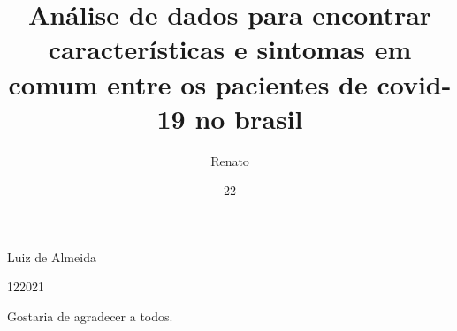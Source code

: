 \documentclass[tcc1]{uftex}
\begin{document}
  \title{Análise de dados para encontrar características e sintomas em comum entre os pacientes de covid-19 no brasil}
  \author{Renato}{Luiz de Almeida}

  \date{22}{12}{2021}
  \maketitle

  \frontmatter

  
  
  \dedication{A algu\'em cujo valor \'e digno desta dedicat\'oria.}

  \begin{acknowledgement}
  Gostaria de agradecer a todos.
  \end{acknowledgement}
\end{document}
